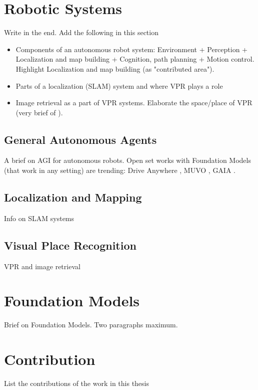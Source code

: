 
\section{Robotic Systems}

Write in the end. Add the following in this section

\begin{itemize}
    \item Components of an autonomous robot system: Environment + 
        Perception + Localization and map building + Cognition, path 
        planning + Motion control. Highlight Localization and map 
        building (as "contributed area").
    \item Parts of a localization (SLAM) system and where VPR plays a 
        role
    \item Image retrieval as a part of VPR systems. Elaborate the 
        space/place of VPR (very brief of \cite{Garg2021WhereIY}).
\end{itemize}

\subsection{General Autonomous Agents}

A brief on AGI for autonomous robots. Open set works with Foundation 
Models (that work in any setting) are trending: Drive Anywhere 
\cite{Wang2023DriveAG}, MUVO \cite{Bogdoll2023MUVOAM}, GAIA
\cite{Hu2023GAIA1AG}.

\subsection{Localization and Mapping}

Info on SLAM systems

\subsection{Visual Place Recognition}

VPR and image retrieval

\section{Foundation Models}

Brief on Foundation Models. Two paragraphs maximum.

\section{Contribution}

List the contributions of the work in this thesis

